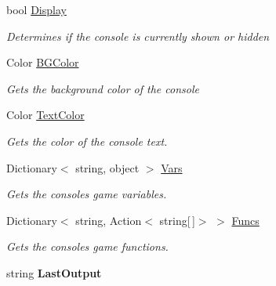 \begin{DoxyCompactItemize}
\item 
bool \hyperlink{class_m_b2_d_1_1_m_b_console_a44be86cd008f735652365afccc777ad1}{Display}
\begin{DoxyCompactList}\small\item\em Determines if the console is currently shown or hidden \end{DoxyCompactList}\item 
Color \hyperlink{class_m_b2_d_1_1_m_b_console_a03439bac4bc6f5c737d221b3a093792d}{B\+G\+Color}
\begin{DoxyCompactList}\small\item\em Gets the background color of the console \end{DoxyCompactList}\item 
Color \hyperlink{class_m_b2_d_1_1_m_b_console_a41089b46b4c440409ccc0018b8a4c822}{Text\+Color}
\begin{DoxyCompactList}\small\item\em Gets the color of the console text. \end{DoxyCompactList}\item 
Dictionary$<$ string, object $>$ \hyperlink{class_m_b2_d_1_1_m_b_console_ac36d5c946f44dc58c82b9ade6c5f689c}{Vars}
\begin{DoxyCompactList}\small\item\em Gets the consoles game variables. \end{DoxyCompactList}\item 
Dictionary$<$ string, Action$<$ string\mbox{[}$\,$\mbox{]}$>$ $>$ \hyperlink{class_m_b2_d_1_1_m_b_console_a11915e9941920f0fbe8457b90dcdcfc7}{Funcs}
\begin{DoxyCompactList}\small\item\em Gets the consoles game functions. \end{DoxyCompactList}\item 
\hypertarget{class_m_b2_d_1_1_m_b_console_a049ea318e8147edb173491c8cf87fe87}{}\label{class_m_b2_d_1_1_m_b_console_a049ea318e8147edb173491c8cf87fe87} 
string {\bfseries Last\+Output}
\end{DoxyCompactItemize}


